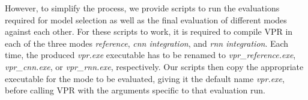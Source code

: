 However, to simplify the process, we provide scripts to run the evaluations required for model selection as well as the final evaluation of different modes against each other. For these scripts to work, it is required to compile \gls{VPR} in each of the three modes \textit{reference}, \textit{cnn integration}, and \textit{rnn integration}. Each time, the produced \textit{vpr.exe} executable has to be renamed to \textit{vpr\_reference.exe}, \textit{vpr\_cnn.exe}, or \textit{vpr\_rnn.exe}, respectively. Our scripts then copy the appropriate executable for the mode to be evaluated, giving it the default name \textit{vpr.exe}, before calling \gls{VPR} with the arguments specific to that evaluation run.

